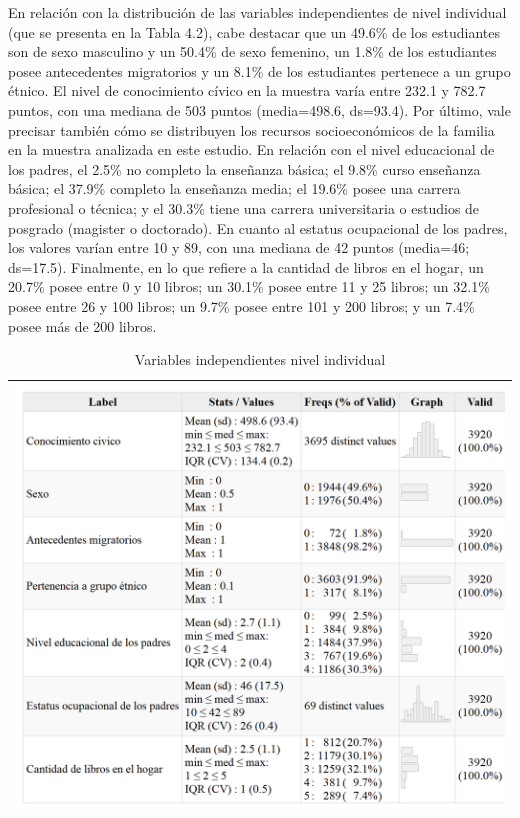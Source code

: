 \documentclass[12pt,twoside]{templates/facsothesis}
\begin{document}
En relación con la distribución de las variables independientes de nivel individual (que se presenta en la Tabla 4.2), cabe destacar que un 49.6\% de los estudiantes son de sexo masculino y un 50.4\% de sexo femenino, un 1.8\% de los estudiantes posee antecedentes migratorios y un 8.1\% de los estudiantes pertenece a un grupo étnico. El nivel de conocimiento cívico en la muestra varía entre 232.1 y 782.7 puntos, con una mediana de 503 puntos (media=498.6, ds=93.4). Por último, vale precisar también cómo se distribuyen los recursos socioeconómicos de la familia en la muestra analizada en este estudio. En relación con el nivel educacional de los padres, el 2.5\% no completo la enseñanza básica; el 9.8\% curso enseñanza básica; el 37.9\% completo la enseñanza media; el 19.6\% posee una carrera profesional o técnica; y el 30.3\% tiene una carrera universitaria o estudios de posgrado (magister o doctorado). En cuanto al estatus ocupacional de los padres, los valores varían entre 10 y 89, con una mediana de 42 puntos (media=46; ds=17.5). Finalmente, en lo que refiere a la cantidad de libros en el hogar, un 20.7\% posee entre 0 y 10 libros; un 30.1\% posee entre 11 y 25 libros; un 32.1\% posee entre 26 y 100 libros; un 9.7\% posee entre 101 y 200 libros; y un 7.4\% posee más de 200 libros.

\begin{longtable}[]{@{}l@{}}
\caption{\label{tab:unnamed-chunk-7}Variables independientes nivel individual}\tabularnewline
\toprule
\endhead
\includegraphics[width=\textwidth,height=0.5\textheight]{input/images/desc01_indep_ind.png} \\
\bottomrule
\end{longtable}
\end{document}
